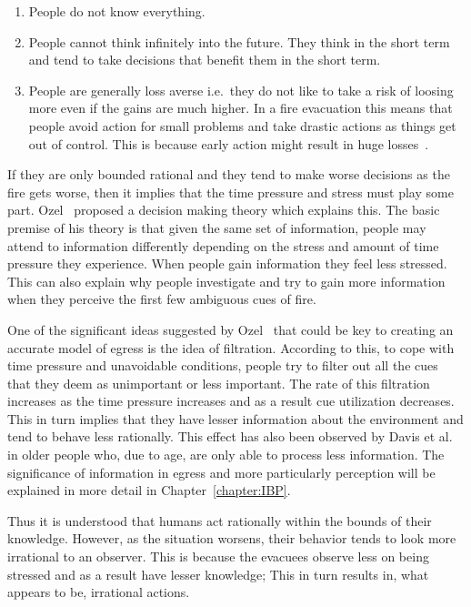 \begin{enumerate}
\item People do not know everything.
\item People cannot think infinitely into the future. They think in the short term and tend to take decisions that benefit them in the short term.
\item People are generally loss averse i.e.\ they do not like to take a risk of loosing more even if the gains are much higher. In a fire evacuation this means that people avoid action for small problems and take drastic actions as things get out of control. This is because early action might result in huge losses~\cite{Graham:2000vl}.
\end{enumerate}

If they are only bounded rational and they tend to make worse decisions as the fire gets worse, then it implies that the time pressure and stress must play some part. Ozel~\cite{Ozel:2001tn} proposed a decision making theory which explains this. The basic premise of his theory is that given the same set of information, people may attend to information differently depending on the stress and amount of time pressure they experience. When people gain information they feel less stressed. This can also explain why people investigate and try to gain more information when they perceive the first few ambiguous cues of fire.

One of the significant ideas suggested by Ozel~\cite{Ozel:2001tn} that could be key to creating an accurate model of egress is the idea of filtration. According to this, to cope with time pressure and unavoidable conditions, people try to filter out all the cues that they deem as unimportant or less important. The rate of this filtration increases as the time pressure increases and as a result cue utilization decreases. This in turn implies that they have lesser information about the environment and tend to behave less rationally. This effect has also been observed by Davis et al.~\cite{Davis01122009} in older people who, due to age, are only able to process less information. The significance of information in egress and more particularly perception will be explained in more detail in Chapter~\ref{chapter:IBP}.

Thus it is understood that humans act rationally within the bounds of their knowledge. However, as the situation worsens, their behavior tends to look more irrational to an observer. This is because the evacuees observe less on being stressed and as a result have lesser knowledge; This in turn results in, what appears to be, irrational actions.

